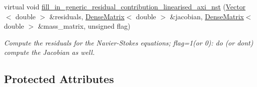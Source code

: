\begin{DoxyCompactItemize}
virtual void \hyperlink{classoomph_1_1LinearisedAxisymmetricNavierStokesEquations_aeb4a4fb1574ee29efdf2bff220e65106}{fill\+\_\+in\+\_\+generic\+\_\+residual\+\_\+contribution\+\_\+linearised\+\_\+axi\+\_\+nst} (\hyperlink{classoomph_1_1Vector}{Vector}$<$ double $>$ \&residuals, \hyperlink{classoomph_1_1DenseMatrix}{Dense\+Matrix}$<$ double $>$ \&jacobian, \hyperlink{classoomph_1_1DenseMatrix}{Dense\+Matrix}$<$ double $>$ \&mass\+\_\+matrix, unsigned flag)
\begin{DoxyCompactList}\small\item\em Compute the residuals for the Navier-\/\+Stokes equations; flag=1(or 0)\+: do (or don\textquotesingle{}t) compute the Jacobian as well. \end{DoxyCompactList}\end{DoxyCompactItemize}
\subsection*{Protected Attributes}
